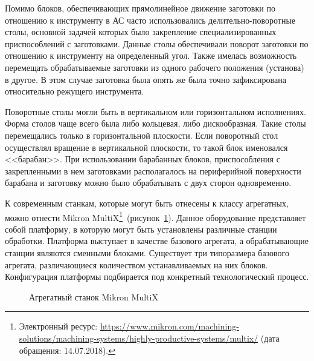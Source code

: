 Помимо блоков, обеспечивающих прямолинейное движение заготовки по отношению к инструменту в АС часто использовались делительно-поворотные столы, основной задачей которых было закрепление специализированных приспособлений с заготовками. Данные столы обеспечивали поворот заготовки по отношению к инструменту на определенный угол. Также имелась возможность перемещать обрабатываемые заготовки из одного рабочего положения (установа) в другое. В этом случае заготовка была опять же была точно зафиксирована относительно режущего инструмента. 

Поворотные столы могли быть в вертикальном или горизонтальном исполнениях. Форма столов чаще всего была либо кольцевая, либо дискообразная. Такие столы перемещались только в горизонтальной плоскости. Если поворотный стол осуществлял вращение в вертикальной плоскости, то такой блок именовался <<барабан>>. При использовании барабанных блоков, приспособления с закрепленными в нем заготовками располагалось на периферийной поверхности барабана и заготовку можно было обрабатывать с двух сторон одновременно.

К современным станкам, которые могут быть отнесены к классу агрегатных, можно отнести Mikron MultiX\footnote{Электронный ресурс: {\small\url{https://www.mikron.com/machining-solutions/machining-systems/highly-productive-systems/multix/}} (дата обращения: 14.07.2018).}~(рисунок~\cref{fig:mikron}). Данное оборудование представляет собой платформу, в которую могут быть установлены различные станции обработки. Платформа выступает в качестве базового агрегата, а обрабатывающие станции являются сменными блоками. Существует три типоразмера базового агрегата, различающиеся количеством устанавливаемых на них блоков. Конфигурация платформы подбирается под конкретный технологический процесс.

\begin{figure}[ht]
	\caption{Агрегатный станок Mikron MultiX}\label{fig:mikron}
\end{figure}

